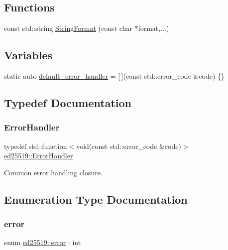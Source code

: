 \subsection*{Functions}
\begin{DoxyCompactItemize}
\item 
const std\+::string \mbox{\hyperlink{namespaceed25519_a908061c627d853b0d7ca46bdf0082310}{String\+Format}} (const char $\ast$format,...)
\end{DoxyCompactItemize}
\subsection*{Variables}
\begin{DoxyCompactItemize}
\item 
static auto \mbox{\hyperlink{namespaceed25519_a7c7bb6ed17541162959c33ed3e3b15fb}{default\+\_\+error\+\_\+handler}} = \mbox{[}$\,$\mbox{]}(const std\+::error\+\_\+code \&code) \{\}
\end{DoxyCompactItemize}


\subsection{Typedef Documentation}
\mbox{\label{namespaceed25519_a6ba572942b3c18591fc869d52a6b16e6}} 
\subsubsection{\texorpdfstring{Error\+Handler}{ErrorHandler}}
{\footnotesize\ttfamily typedef std\+::function$<$void(const std\+::error\+\_\+code \&code)$>$ \mbox{\hyperlink{namespaceed25519_a6ba572942b3c18591fc869d52a6b16e6}{ed25519\+::\+Error\+Handler}}}

Common error handling closure. 

\subsection{Enumeration Type Documentation}
\mbox{\label{namespaceed25519_ac93d0b5156eaca22197055e902920bc4}} 
\subsubsection{\texorpdfstring{error}{error}}
{\footnotesize\ttfamily enum \mbox{\hyperlink{namespaceed25519_ac93d0b5156eaca22197055e902920bc4}{ed25519\+::error}} \+: int}

